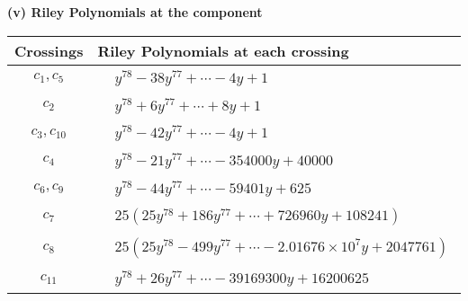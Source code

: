 \documentclass[1p]{elsarticle_modified}
\theoremstyle{definition}
\begin{document}
\newpage\renewcommand{\arraystretch}{1}
\flushleft \textbf{(v) Riley Polynomials at the component}\newline \\
\begin{tabular}{m{50pt}|m{274pt}}
Crossings & \hspace{64pt}Riley Polynomials at each crossing \\
\hline $$\begin{aligned}c_{1},c_{5}\end{aligned}$$&$\begin{aligned}
&y^{78}-38 y^{77}+\cdots-4 y+1
\end{aligned}$\\
\hline $$\begin{aligned}c_{2}\end{aligned}$$&$\begin{aligned}
&y^{78}+6 y^{77}+\cdots+8 y+1
\end{aligned}$\\
\hline $$\begin{aligned}c_{3},c_{10}\end{aligned}$$&$\begin{aligned}
&y^{78}-42 y^{77}+\cdots-4 y+1
\end{aligned}$\\
\hline $$\begin{aligned}c_{4}\end{aligned}$$&$\begin{aligned}
&y^{78}-21 y^{77}+\cdots-354000 y+40000
\end{aligned}$\\
\hline $$\begin{aligned}c_{6},c_{9}\end{aligned}$$&$\begin{aligned}
&y^{78}-44 y^{77}+\cdots-59401 y+625
\end{aligned}$\\
\hline $$\begin{aligned}c_{7}\end{aligned}$$&$\begin{aligned}
&25(25 y^{78}+186 y^{77}+\cdots+726960 y+108241)
\end{aligned}$\\
\hline $$\begin{aligned}c_{8}\end{aligned}$$&$\begin{aligned}
&25(25 y^{78}-499 y^{77}+\cdots-2.01676\times10^{7} y+2047761)
\end{aligned}$\\
\hline $$\begin{aligned}c_{11}\end{aligned}$$&$\begin{aligned}
&y^{78}+26 y^{77}+\cdots-39169300 y+16200625
\end{aligned}$\\
\hline
\end{tabular}\\~\\
\end{document}
